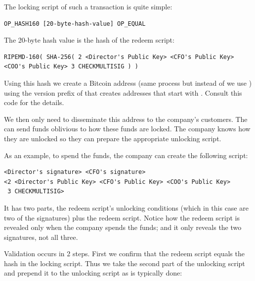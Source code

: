 The locking script of such a transaction is quite simple:

\begin{emphbox}
\begin{lstlisting}[style=Pseudomath]
OP_HASH160 [20-byte-hash-value] OP_EQUAL
\end{lstlisting}
\end{emphbox}

The 20-byte hash value is the hash of the redeem script:

\begin{emphbox}
\begin{lstlisting}[style=Pseudomath]
RIPEMD-160( SHA-256( 2 <Director's Public Key> <CFO's Public Key> 
<COO's Public Key> 3 CHECKMULTISIG ) )
\end{lstlisting}
\end{emphbox}

Using this hash we create a Bitcoin address (same process but instead of  we use ) using the version prefix of  that creates addresses that start with . Consult this code for the details.

We then only need to disseminate this address to the company’s customers. The can send funds oblivious to how these funds are locked. The company knows how they are unlocked so they can prepare the appropriate unlocking script.

As an example, to spend the funds, the company can create the following script:

\begin{emphbox}
\begin{lstlisting}[style=Pseudomath]
<Director's signature> <CFO's signature> 
<2 <Director's Public Key> <CFO's Public Key> <COO's Public Key> 
 3 CHECKMULTISIG>
\end{lstlisting}
\end{emphbox}

It has two parts, the redeem script’s unlocking conditions (which in this case are two of the signatures) plus the redeem script. Notice how the redeem script is revealed only when the company spends the funds; and it only reveals the two signatures, not all three.

Validation occurs in 2 steps. First we confirm that the redeem script equals the hash in the locking script. Thus we take the second part of the unlocking script and prepend it to the unlocking script as is typically done:


